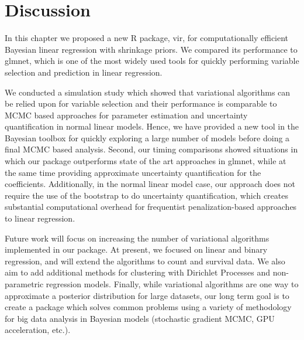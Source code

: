 \documentclass[]{article}
\let\proglang=\textsf
\newcommand{\pkg}[1]{{\fontseries{b}\selectfont #1}}
\begin{document}
\section{Discussion} \label{sec:vir:discussion}

In this chapter we proposed a new \proglang{R} package, \pkg{vir}, for
computationally efficient Bayesian linear regression with shrinkage priors.  We
compared its performance to \pkg{glmnet}, which is one of the most widely used
tools for quickly performing variable selection and prediction in linear
regression. 

We conducted a simulation study which showed that variational algorithms can be
relied upon for variable selection and their performance is comparable to MCMC
based approaches for parameter estimation and uncertainty quantification in
normal linear models. Hence, we have provided a new tool in the Bayesian toolbox
for quickly exploring a large number of models before doing a final MCMC based
analysis. Second, our timing comparisons showed situations in which our package
outperforms state of the art approaches in \pkg{glmnet}, while at the same time
providing approximate uncertainty quantification for the coefficients.
Additionally, in the normal linear model case, our approach does not require the
use of the bootstrap to do uncertainty quantification, which creates substantial
computational overhead for frequentist penalization-based approaches to linear
regression. 

Future work will focus on increasing the number of variational algorithms
implemented in our package. At present, we focused on linear and binary
regression, and will extend the algorithms to count and survival data. We also
aim to add additional methods for clustering with Dirichlet Processes and
non-parametric regression models.  Finally, while variational algorithms are one
way to approximate a posterior distribution for large datasets, our long term
goal is to create a package which solves common problems using a variety of
methodology for big data analysis in Bayesian models (stochastic gradient MCMC,
GPU acceleration, etc.). 	



\end{document}
